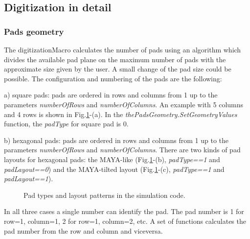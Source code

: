 \subsection{Digitization in detail}

\subsubsection{Pads geometry}
The digitizationMacro calculates the number of pads using an algorithm which divides the available pad plane on the maximum number of pads with the approximate size given by the user. A small change of the pad size could be possible. The configuration and numbering of the pads are the following:

a) square pads: pads are ordered in rows and columns from 1 up to the parameters \textit{numberOfRows} and \textit{numberOfColumns}. An example with 5 columns and 4 rows is shown in Fig.\ref{fig-pad-layout}-(a). In the \textit{thePadsGeometry.SetGeometryValues} function, the \textit{padType} for square pad is 0.

b) hexagonal pads: pads are ordered in rows and columns from 1 up to the parameters \textit{numberOfRows} and \textit{numberOfColumns}. There are two kinds of pad layouts for hexagonal pads: the MAYA-like (Fig.\ref{fig-pad-layout}-(b), \textit{padType==1} and \textit{padLayout==0}) and the MAYA-tilted layout (Fig.\ref{fig-pad-layout}-(c), \textit{padType==1} and \textit{padLayout==1}).

\begin{figure}[htbp]
%
\caption{Pad types and layout patterns in the simulation code.}\label{fig-pad-layout}
\end{figure}

In all three cases a single number can identify the pad. The pad number is 1 for row=1, column=1, 2 for row=1, column=2, etc. A set of functions calculates the pad number from the row and column and viceversa.

